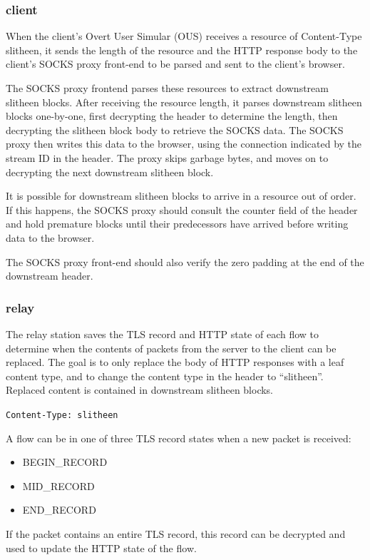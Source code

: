 \documentclass[11pt]{article}
\theoremstyle{definittion}
\begin{document}
\subsubsection{client}

When the client's Overt User Simular (OUS) receives a resource of Content-Type slitheen, it sends the length of the resource and the HTTP response body to the client's SOCKS proxy front-end to be parsed and sent to the client's browser. 

The SOCKS proxy frontend parses these resources to extract downstream slitheen blocks. After receiving the resource length, it parses downstream slitheen blocks one-by-one, first decrypting the header to determine the length, then decrypting the slitheen block body to retrieve the SOCKS data. The SOCKS proxy then writes this data to the browser, using the connection indicated by the stream ID in the header. The proxy skips garbage bytes, and moves on to decrypting the next downstream slitheen block.

It is possible for downstream slitheen blocks to arrive in a resource out of order. If this happens, the SOCKS proxy should consult the counter field of the header and hold premature blocks until their predecessors have arrived before writing data to the browser.

The SOCKS proxy front-end should also verify the zero padding at the end of the downstream header.

\subsubsection{relay}
The relay station saves the TLS record and HTTP state of each flow to determine when the contents of packets from the server to the client can be replaced. The goal is to only replace the body of HTTP responses with a leaf content type, and to change the content type in the header to ``slitheen''. Replaced content is contained in downstream slitheen blocks.

\texttt{Content-Type: slitheen}

A flow can be in one of three TLS record states when a new packet is received:
\begin{itemize}
\item BEGIN\_RECORD
\item MID\_RECORD
\item END\_RECORD
\end{itemize}

If the packet contains an entire TLS record, this record can be decrypted and used to update the HTTP state of the flow.
\end{document}
